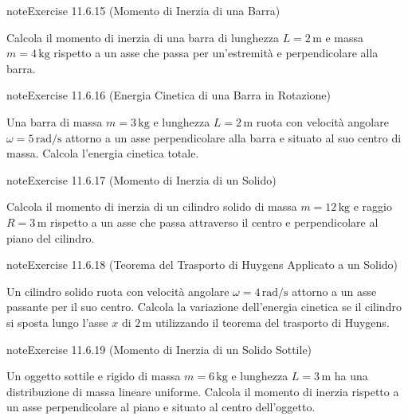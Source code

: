 \documentclass[letterpaper,10pt,italian]{jupyterBook}
\begin{document}
\begin{sphinxadmonition}{note}{Exercise 11.6.15 (Momento di Inerzia di una Barra)}



\sphinxAtStartPar
Calcola il momento di inerzia di una barra di lunghezza \(L = 2 \, \text{m}\) e massa \(m = 4 \, \text{kg}\) rispetto a un asse che passa per un’estremità e perpendicolare alla barra.
\end{sphinxadmonition}
 \label{exercise:ch/mechanics/inertia-problems-exercise-15}

\begin{sphinxadmonition}{note}{Exercise 11.6.16 (Energia Cinetica di una Barra in Rotazione)}



\sphinxAtStartPar
Una barra di massa \(m = 3 \, \text{kg}\) e lunghezza \(L = 2 \, \text{m}\) ruota con velocità angolare \(\omega = 5 \, \text{rad/s}\) attorno a un asse perpendicolare alla barra e situato al suo centro di massa. Calcola l’energia cinetica totale.
\end{sphinxadmonition}
 \label{exercise:ch/mechanics/inertia-problems-exercise-16}

\begin{sphinxadmonition}{note}{Exercise 11.6.17 (Momento di Inerzia di un Solido)}



\sphinxAtStartPar
Calcola il momento di inerzia di un cilindro solido di massa \(m = 12 \, \text{kg}\) e raggio \(R = 3 \, \text{m}\) rispetto a un asse che passa attraverso il centro e perpendicolare al piano del cilindro.
\end{sphinxadmonition}
 \label{exercise:ch/mechanics/inertia-problems-exercise-17}

\begin{sphinxadmonition}{note}{Exercise 11.6.18 (Teorema del Trasporto di Huygens Applicato a un Solido)}



\sphinxAtStartPar
Un cilindro solido ruota con velocità angolare \(\omega = 4 \, \text{rad/s}\) attorno a un asse passante per il suo centro. Calcola la variazione dell’energia cinetica se il cilindro si sposta lungo l’asse \(x\) di \(2 \, \text{m}\) utilizzando il teorema del trasporto di Huygens.
\end{sphinxadmonition}
 \label{exercise:ch/mechanics/inertia-problems-exercise-18}

\begin{sphinxadmonition}{note}{Exercise 11.6.19 (Momento di Inerzia di un Solido Sottile)}



\sphinxAtStartPar
Un oggetto sottile e rigido di massa \(m = 6 \, \text{kg}\) e lunghezza \(L = 3 \, \text{m}\) ha una distribuzione di massa lineare uniforme. Calcola il momento di inerzia rispetto a un asse perpendicolare al piano e situato al centro dell’oggetto.
\end{sphinxadmonition}
 \label{exercise:ch/mechanics/inertia-problems-exercise-19}
\end{document}
